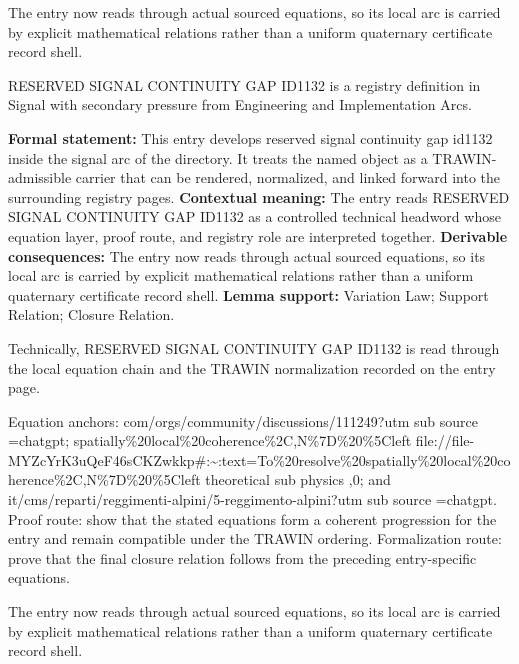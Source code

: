 The entry now reads through actual sourced equations, so its local arc is carried by explicit mathematical relations rather than a uniform quaternary certificate record shell.
\clearpage


\begingroup\small
{}
RESERVED SIGNAL CONTINUITY GAP ID1132 is a registry definition in Signal with secondary pressure from Engineering and Implementation Arcs.

\begingroup\footnotesize\setlength{\emergencystretch}{3em}\sloppy
\textbf{Formal statement:} This entry develops reserved signal continuity gap id1132 inside the signal arc of the directory. It treats the named object as a TRAWIN-admissible carrier that can be rendered, normalized, and linked forward into the surrounding registry pages. \textbf{Contextual meaning:} The entry reads RESERVED SIGNAL CONTINUITY GAP ID1132 as a controlled technical headword whose equation layer, proof route, and registry role are interpreted together. \textbf{Derivable consequences:} The entry now reads through actual sourced equations, so its local arc is carried by explicit mathematical relations rather than a uniform quaternary certificate record shell. \textbf{Lemma support:} Variation Law; Support Relation; Closure Relation.\par
\endgroup

Technically, RESERVED SIGNAL CONTINUITY GAP ID1132 is read through the local equation chain and the TRAWIN normalization recorded on the entry page.

Equation anchors: com/orgs/community/discussions/111249?utm sub source =chatgpt; spatially\%20local\%20coherence\%2C,N\%7D\%20\%5Cleft file://file-MYZcYrK3uQeF46sCKZwkkp\#:\textasciitilde{}:text=To\%20resolve\%20spatially\%20local\%20coherence\%2C,N\%7D\%20\%5Cleft theoretical sub physics ,0; and it/cms/reparti/reggimenti-alpini/5-reggimento-alpini?utm sub source =chatgpt. Proof route: show that the stated equations form a coherent progression for the entry and remain compatible under the TRAWIN ordering. Formalization route: prove that the final closure relation follows from the preceding entry-specific equations.

The entry now reads through actual sourced equations, so its local arc is carried by explicit mathematical relations rather than a uniform quaternary certificate record shell.
\endgroup

